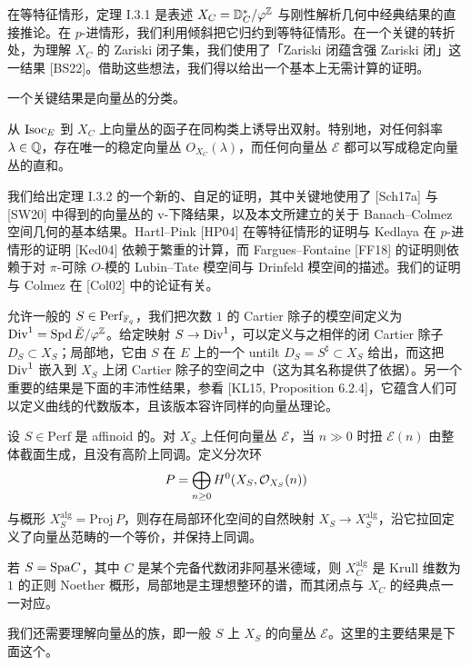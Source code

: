 在等特征情形，定理 I.3.1 是表述 $X_C=\mathbb{D}^*_C/\varphi^{\mathbb{Z}}$ 与刚性解析几何中经典结果的直接推论。在 $p$-进情形，我们利用倾斜把它归约到等特征情形。在一个关键的转折处，为理解 $X_C$ 的 Zariski 闭子集，我们使用了「Zariski 闭蕴含强 Zariski 闭」这一结果 [BS22]。借助这些想法，我们得以给出一个基本上无需计算的证明。

一个关键结果是向量丛的分类。

\begin{theorem}%
从 $\mathrm{Isoc}_E$ 到 $X_C$ 上向量丛的函子在同构类上诱导出双射。特别地，对任何斜率 $\lambda\in\mathbb{Q}$，存在唯一的稳定向量丛 $O_{X_C}(\lambda)$，而任何向量丛 $\mathcal{E}$ 都可以写成稳定向量丛的直和。
\end{theorem}

我们给出定理 I.3.2 的一个新的、自足的证明，其中关键地使用了 [Sch17a] 与 [SW20] 中得到的向量丛的 v-下降结果，以及本文所建立的关于 Banach–Colmez 空间几何的基本结果。Hartl–Pink [HP04] 在等特征情形的证明与 Kedlaya 在 $p$-进情形的证明 [Ked04] 依赖于繁重的计算，而 Fargues–Fontaine [FF18] 的证明则依赖于对 $\pi$-可除 $O$-模的 Lubin–Tate 模空间与 Drinfeld 模空间的描述。我们的证明与 Colmez 在 [Col02] 中的论证有关。

允许一般的 $S\in\mathrm{Perf}_{\mathbb{F}_q}$，我们把次数 $1$ 的 Cartier 除子的模空间定义为 $\mathrm{Div}^1=\mathrm{Spd}\,\breve{E}/\varphi^{\mathbb{Z}}$。给定映射 $S\to\mathrm{Div}^1$，可以定义与之相伴的闭 Cartier 除子 $D_S\subset X_S$；局部地，它由 $S$ 在 $E$ 上的一个 untilt $D_S=S^\sharp\subset X_S$ 给出，而这把 $\mathrm{Div}^1$ 嵌入到 $X_S$ 上闭 Cartier 除子的空间之中（这为其名称提供了依据）。另一个重要的结果是下面的丰沛性结果，参看 [KL15, Proposition 6.2.4]，它蕴含人们可以定义曲线的代数版本，且该版本容许同样的向量丛理论。

\begin{theorem}%
\leavevmode{}设 $S\in\mathrm{Perf}$ 是 affinoid 的。对 $X_S$ 上任何向量丛 $\mathcal{E}$，当 $n\gg0$ 时扭 $\mathcal{E}(n)$ 由整体截面生成，且没有高阶上同调。定义分次环
\[
  P = \bigoplus_{n\ge0}H^0(X_S,\mathcal{O}_{X_S}(n))
\]
与概形 $X_S^{\mathrm{alg}}=\mathrm{Proj}\,P$，则存在局部环化空间的自然映射 $X_S\to X_S^{\mathrm{alg}}$，沿它拉回定义了向量丛范畴的一个等价，并保持上同调。

若 $S=\mathrm{Spa} C$，其中 $C$ 是某个完备代数闭非阿基米德域，则 $X_C^{\mathrm{alg}}$ 是 Krull 维数为 $1$ 的正则 Noether 概形，局部地是主理想整环的谱，而其闭点与 $X_C$ 的经典点一一对应。
\end{theorem}

我们还需要理解向量丛的族，即一般 $S$ 上 $X_S$ 的向量丛 $\mathcal{E}$。这里的主要结果是下面这个。

